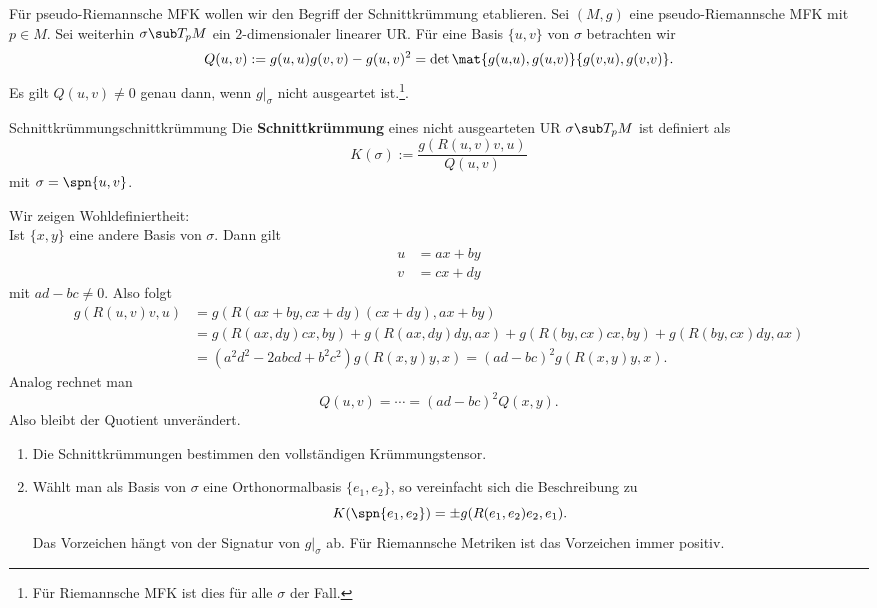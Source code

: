 Für pseudo-Riemannsche MFK wollen wir den Begriff der Schnittkrümmung etablieren.
Sei $(M,g)$ eine pseudo-Riemannsche MFK mit $p \in M$. Sei weiterhin $\sigma \sub T_pM$ ein $2$-dimensionaler linearer UR. Für eine Basis $\{u,v\}$ von $\sigma$ betrachten wir
\begin{equation}
Q(u,v):= g(u,u)g(v,v)-g(u,v)^2 = \det \mat{g(u {,} u),g(u {,} v)}{g(v {,} u),g(v {,} v)}.
\end{equation}
Es gilt $Q(u,v) \neq 0$ genau dann, wenn $g|_\sigma$ nicht ausgeartet ist.\footnote{Für Riemannsche MFK ist dies für alle $\sigma$ der Fall.}.
\begin{definition}{Schnittkrümmung}{schnittkrümmung}
Die \textbf{Schnittkrümmung} eines nicht ausgearteten UR $\sigma \sub T_pM$ ist definiert als
\begin{equation}
K(\sigma):=\frac{g(R(u,v)v,u)}{Q(u,v)}
\end{equation}
mit $\sigma = \spn \{u,v\}$.
\end{definition}
Wir zeigen Wohldefiniertheit:\\
Ist $\{x,y\}$ eine andere Basis von $\sigma$. Dann gilt
\begin{align}
u&=ax+by\\
v&=cx+dy
\end{align}
mit $ad-bc\neq 0$. Also folgt 
\begin{align}
g(R(u,v)v,u)&=g(R(ax+by,cx+dy)(cx+dy),ax+by)\\
&=g(R(ax,dy)cx,by)+g(R(ax,dy)dy,ax)+g(R(by,cx)cx,by)+g(R(by,cx)dy,ax)\\
&=(a^2d^2-2abcd+b^2c^2)g(R(x,y)y,x)=(ad-bc)^2g(R(x,y)y,x).
\end{align}
Analog rechnet man
\begin{equation}
Q(u,v)=\cdots = (ad-bc)^2Q(x,y).
\end{equation}
Also bleibt der Quotient unverändert.
\begin{bemerkungen}
\begin{enumerate}
\item Die Schnittkrümmungen bestimmen den vollständigen Krümmungstensor.
\item Wählt man als Basis von $\sigma$ eine Orthonormalbasis $\{e_1,e_2\}$, so vereinfacht sich die Beschreibung zu
\begin{equation}
K(\spn \{e_1,e_2\}) = \pm g(R(e_1,e_2)e_2,e_1).
\end{equation}
Das Vorzeichen hängt von der Signatur von $g|_\sigma$ ab. Für Riemannsche Metriken ist das Vorzeichen immer positiv.
\end{enumerate}
\end{bemerkungen}
